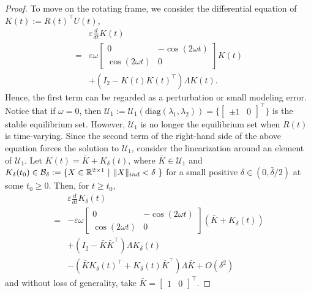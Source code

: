 \documentclass[10pt,a4paper]{amsart}
\begin{document}
    \begin{proof}
    To move on the rotating frame, we consider the differential equation of $K(t) := R(t) ^{\top} U(t)$, 
    \begin{align*}
    &\varepsilon \frac{d}{dt} K(t) 
    \\
    =&
    \varepsilon \omega 
    \begin{bmatrix}
    0 & - \cos (2\omega t) \\ \cos (2\omega t) & 0
    \end{bmatrix} K(t)
    \\
    &
    +
    (I_{2} - K(t) K(t)^{\top}) \Lambda K(t)
    .
    \end{align*}
    Hence, the first term can be regarded as a perturbation or small modeling error. 
    Notice that if $\omega =0 $, then ${\mathcal{U}}_{1} := {\mathcal{U}}_{1}({\mathrm{diag}}(\lambda_{1}, \lambda _{2})) = \{ \begin{bmatrix} \pm 1 & 0 \end{bmatrix} ^{\top} \}$ is the stable equilibrium set. 
    However, ${\mathcal{U}}_{1}$ is no longer the equilibrium set when $R(t)$ is time-varying. 
    Since the second term of the right-hand side of the above equation forces the solution to ${\mathcal{U}}_{1}$, consider the linearization around an element of ${\mathcal{U}}_{1}$. 
    Let $K(t) = \bar{K} + K_{\delta}(t)$, where $\bar{K} \in {\mathcal{U}}_{1}$ and $K_{\delta}(t_{0}) \in {\mathcal{B}}_{\delta} := \{ X \in {\mathbb{R}}^{2\times 1} \ | \ \| X \| _{\rm ind} < \delta \ \}$ for a small positive $\delta \in (0, \bar{\delta} /2)$ at some $t_{0}\geq 0$. 
    Then, for $t\geq t_{0}$, 
    \begin{align*}
    & \varepsilon \frac{d}{dt} K_{\delta}(t) 
    \\
    =&
    -\varepsilon \omega \begin{bmatrix}
    0 & - \cos (2\omega t) \\ \cos (2\omega t) & 0
    \end{bmatrix} ( \bar{K} + K_{\delta}(t) )
    \\
    & +
    ( I_{2} - \bar{K} \bar{K}^{\top} ) \Lambda K_{\delta}(t)
    \\
    &
    -
    (\bar{K} K_{\delta} (t)^{\top} + K_{\delta}(t) \bar{K}^{\top} ) \Lambda \bar{K}
    + O (\delta ^2) 
    \end{align*}
    and without loss of generality, take $\bar{K} = \begin{bmatrix} 1 & 0 \end{bmatrix} ^{\top}$.  

\end{proof}
\end{document}
